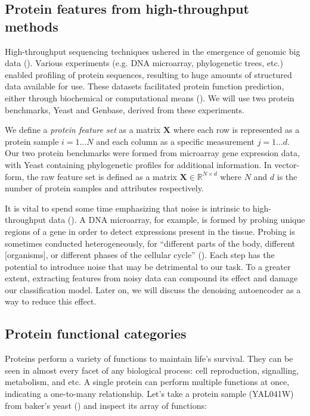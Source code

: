 \subsection{Protein features from high-throughput methods}

\par High-throughput sequencing techniques ushered in the emergence of genomic
big data (\cite{reuter2015high}). Various experiments (e.g. DNA microarray,
phylogenetic trees, etc.) enabled profiling of protein sequences, resulting to
huge amounts of structured data available for use. These datasets facilitated
protein function prediction, either through biochemical or computational means
(\cite{eisenberg2000protein, marcotte1999combined}). We will use two protein
benchmarks, Yeast and Genbase, derived from these experiments.

\par We define a \textit{protein feature set} as a matrix $\mathbf{X}$ where
each row is represented as a protein sample $i=1\dots N$ and each column as a
specific measurement $j=1 \dots d$. Our two protein benchmarks were formed from
microarray gene expression data, with Yeast containing phylogenetic profiles
for additional information. In vector-form, the raw feature set is defined as a
matrix $\mathbf{X} \in \mathbb{R}^{N \times d}$ where $N$ and $d$ is the number
of protein samples and attributes respectively.

\par It is vital to spend some time emphasizing that noise is intrinsic to
high-throughput data (\cite{hong2013estimating}). A DNA microarray, for
example, is formed by probing unique regions of a gene in order to detect
expressions present in the tissue. Probing is sometimes conducted
heterogeneously, for ``different parts of the body, different [organisms], or
different phases of the cellular cycle'' (\cite{nguyen2009noise}). Each step
has the potential to introduce noise that may be detrimental to our task. To a
greater extent, extracting features from noisy data can compound its effect and
damage our classification model. Later on, we will discuss the denoising
autoencoder as a way to reduce this effect.

\subsection{Protein functional categories}

\par Proteins perform a variety of functions to maintain life's survival. They
can be seen in almost every facet of any biological process: cell
reproduction, signalling, metabolism, and etc. A single protein can perform
multiple functions at once, indicating a one-to-many relationship. Let's take
a protein sample (YAL041W) from baker's yeast (\cite{elisseeff2001kernel})
and inspect its array of functions:

